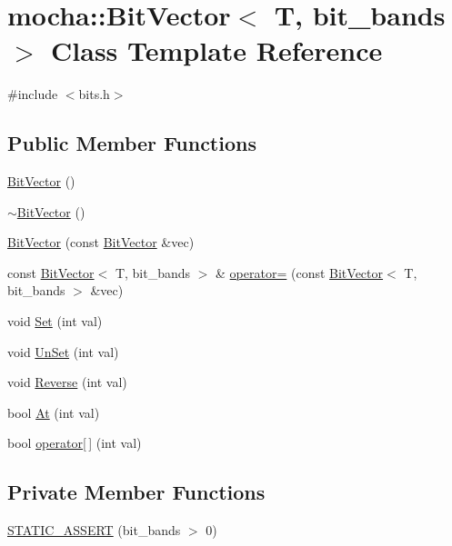 \hypertarget{classmocha_1_1_bit_vector}{
\section{mocha::BitVector$<$ T, bit\_\-bands $>$ Class Template Reference}
\label{classmocha_1_1_bit_vector}
}


{\ttfamily \#include $<$bits.h$>$}

\subsection*{Public Member Functions}
\begin{DoxyCompactItemize}
\item 
\hyperlink{classmocha_1_1_bit_vector_adfcef8fc10b228a545e2663f16531430}{BitVector} ()
\item 
\hyperlink{classmocha_1_1_bit_vector_a76452ed17ca332f1d49b277ea616110e}{$\sim$BitVector} ()
\item 
\hyperlink{classmocha_1_1_bit_vector_ad69f348fe9de383004a69c769551b8a6}{BitVector} (const \hyperlink{classmocha_1_1_bit_vector}{BitVector} \&vec)
\item 
const \hyperlink{classmocha_1_1_bit_vector}{BitVector}$<$ T, bit\_\-bands $>$ \& \hyperlink{classmocha_1_1_bit_vector_a6db4073dc525ead42cf101c1e1bfca15}{operator=} (const \hyperlink{classmocha_1_1_bit_vector}{BitVector}$<$ T, bit\_\-bands $>$ \&vec)
\item 
void \hyperlink{classmocha_1_1_bit_vector_a9bc91f973a980564f246500260c75db0}{Set} (int val)
\item 
void \hyperlink{classmocha_1_1_bit_vector_a3af98e0c39acef618232aa6a75531e9b}{UnSet} (int val)
\item 
void \hyperlink{classmocha_1_1_bit_vector_a382b9dcb9ca1a08ba81b1a1f98d9a25c}{Reverse} (int val)
\item 
bool \hyperlink{classmocha_1_1_bit_vector_a1d8baf3fe19959f7b1e4777ffc2a0182}{At} (int val)
\item 
bool \hyperlink{classmocha_1_1_bit_vector_acd0e54057805396cc6c5d6406ba13005}{operator\mbox{[}$\,$\mbox{]}} (int val)
\end{DoxyCompactItemize}
\subsection*{Private Member Functions}
\begin{DoxyCompactItemize}
\item 
\hyperlink{classmocha_1_1_bit_vector_a524e2a640a37be416e2e945ae73a3e0a}{STATIC\_\-ASSERT} (bit\_\-bands $>$ 0)
\end{DoxyCompactItemize}
